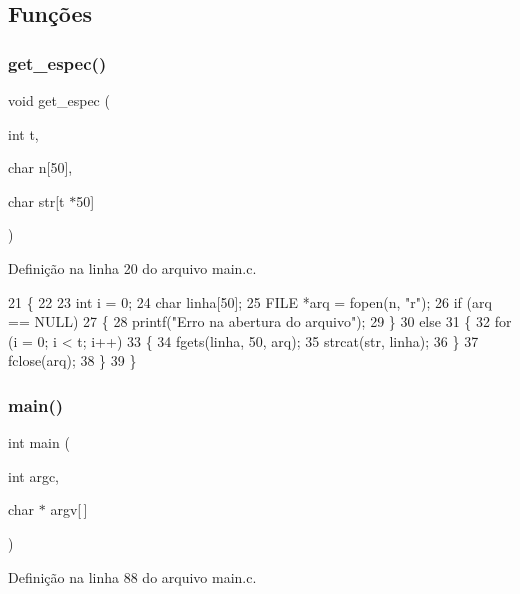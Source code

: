 \subsection{Funções}
\mbox{\label{main_8c_aa67d76868a5c269b62ce140a769a6afe}} 
\subsubsection{get\+\_\+espec()}
{\footnotesize\ttfamily void get\+\_\+espec (\begin{DoxyParamCaption}\item[{int}]{t,  }\item[{char}]{n[50],  }\item[{char}]{str[t $\ast$50] }\end{DoxyParamCaption})}



Definição na linha 20 do arquivo main.\+c.


\begin{DoxyCode}
21 \{
22 
23     \textcolor{keywordtype}{int} i = 0;
24     \textcolor{keywordtype}{char} linha[50];
25     FILE *arq = fopen(n, \textcolor{stringliteral}{"r"});
26     \textcolor{keywordflow}{if} (arq == NULL)
27     \{
28         printf(\textcolor{stringliteral}{"Erro na abertura do arquivo"});
29     \}
30     \textcolor{keywordflow}{else}
31     \{
32         \textcolor{keywordflow}{for} (i = 0; i < t; i++)
33         \{
34             fgets(linha, 50, arq);
35             strcat(str, linha);
36         \}
37         fclose(arq);
38     \}
39 \}
\end{DoxyCode}
\mbox{\label{main_8c_a0ddf1224851353fc92bfbff6f499fa97}} 
\subsubsection{main()}
{\footnotesize\ttfamily int main (\begin{DoxyParamCaption}\item[{int}]{argc,  }\item[{char $\ast$}]{argv[$\,$] }\end{DoxyParamCaption})}



Definição na linha 88 do arquivo main.\+c.


